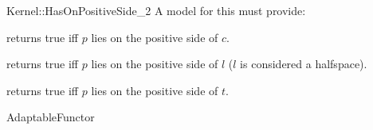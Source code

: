 \begin{ccRefFunctionObjectConcept}{Kernel::HasOnPositiveSide_2}
A model for this must provide:


{returns true iff $p$ lies on the positive side of $c$.}

{returns true iff $p$ lies on the positive side of $l$ 
($l$ is considered a halfspace).}

{returns true iff $p$ lies on the positive side of $t$.}

\ccRefines
AdaptableFunctor

\ccSeeAlso
{} \\
\\
\\

\end{ccRefFunctionObjectConcept}
